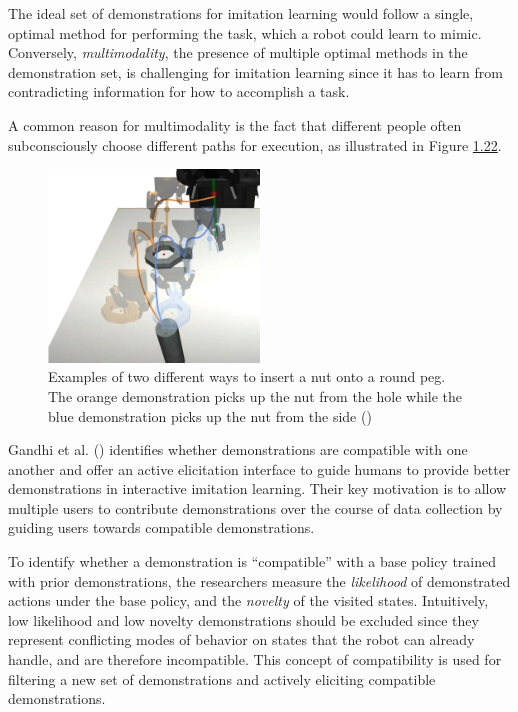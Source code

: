 \documentclass[
  letterpaper,
  DIV=11,
  numbers=noendperiod,
  oneside]{scrreprt}
\theoremstyle{remark}
\begin{document}
The ideal set of demonstrations for imitation learning would follow a
single, optimal method for performing the task, which a robot could
learn to mimic. Conversely, \emph{multimodality}, the presence of
multiple optimal methods in the demonstration set, is challenging for
imitation learning since it has to learn from contradicting information
for how to accomplish a task.

A common reason for multimodality is the fact that different people
often subconsciously choose different paths for execution, as
illustrated in Figure \hyperref[fig:multimodalexecution]{1.22}.

\begin{figure}

{\centering \includegraphics[width=0.5\textwidth,height=\textheight]{src/Figures/multimodal_peg.png}

}

\caption{Examples of two different ways to insert a nut onto a round
peg. The orange demonstration picks up the nut from the hole while the
blue demonstration picks up the nut from the side
()}

\end{figure}%

Gandhi et al. ()
identifies whether demonstrations are compatible with one another and
offer an active elicitation interface to guide humans to provide better
demonstrations in interactive imitation learning. Their key motivation
is to allow multiple users to contribute demonstrations over the course
of data collection by guiding users towards compatible demonstrations.

To identify whether a demonstration is ``compatible'' with a base policy
trained with prior demonstrations, the researchers measure the
\emph{likelihood} of demonstrated actions under the base policy, and the
\emph{novelty} of the visited states. Intuitively, low likelihood and
low novelty demonstrations should be excluded since they represent
conflicting modes of behavior on states that the robot can already
handle, and are therefore incompatible. This concept of compatibility is
used for filtering a new set of demonstrations and actively eliciting
compatible demonstrations.
\end{document}
